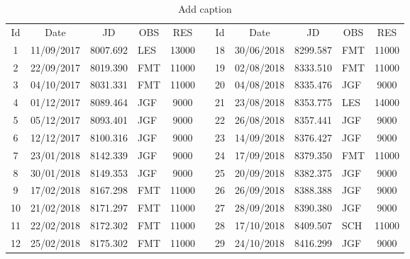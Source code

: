 \begin{table}[htbp]
  \centering
  \caption{Add caption}
    \begin{tabular}{|c|c|c|p{1.715em}|c|r|c|c|c|p{1.715em}|c|}
\cline{1-5}\cline{7-11}    Id    & Date  & JD    & \multicolumn{1}{c|}{OBS} & RES   &       & Id    & Date  & JD    & \multicolumn{1}{c|}{OBS} & RES \bigstrut\\
\cline{1-5}\cline{7-11}    1     & 11/09/2017 & 8007.692 & LES   & 13000 &       & 18    & 30/06/2018 & 8299.587 & FMT   & 11000 \bigstrut\\
\cline{1-5}\cline{7-11}    2     & 22/09/2017 & 8019.390 & FMT   & 11000 &       & 19    & 02/08/2018 & 8333.510 & FMT   & 11000 \bigstrut\\
\cline{1-5}\cline{7-11}    3     & 04/10/2017 & 8031.331 & FMT   & 11000 &       & 20    & 04/08/2018 & 8335.476 & JGF   & 9000 \bigstrut\\
\cline{1-5}\cline{7-11}    4     & 01/12/2017 & 8089.464 & JGF   & 9000  &       & 21    & 23/08/2018 & 8353.775 & LES   & 14000 \bigstrut\\
\cline{1-5}\cline{7-11}    5     & 05/12/2017 & 8093.401 & JGF   & 9000  &       & 22    & 26/08/2018 & 8357.441 & JGF   & 9000 \bigstrut\\
\cline{1-5}\cline{7-11}    6     & 12/12/2017 & 8100.316 & JGF   & 9000  &       & 23    & 14/09/2018 & 8376.427 & JGF   & 9000 \bigstrut\\
\cline{1-5}\cline{7-11}    7     & 23/01/2018 & 8142.339 & JGF   & 9000  &       & 24    & 17/09/2018 & 8379.350 & FMT   & 11000 \bigstrut\\
\cline{1-5}\cline{7-11}    8     & 30/01/2018 & 8149.353 & JGF   & 9000  &       & 25    & 20/09/2018 & 8382.375 & JGF   & 9000 \bigstrut\\
\cline{1-5}\cline{7-11}    9     & 17/02/2018 & 8167.298 & FMT   & 11000 &       & 26    & 26/09/2018 & 8388.388 & JGF   & 9000 \bigstrut\\
\cline{1-5}\cline{7-11}    10    & 21/02/2018 & 8171.297 & FMT   & 11000 &       & 27    & 28/09/2018 & 8390.380 & JGF   & 9000 \bigstrut\\
\cline{1-5}\cline{7-11}    11    & 22/02/2018 & 8172.302 & FMT   & 11000 &       & 28    & 17/10/2018 & 8409.507 & SCH   & 11000 \bigstrut\\
\cline{1-5}\cline{7-11}    12    & 25/02/2018 & 8175.302 & FMT   & 11000 &       & 29    & 24/10/2018 & 8416.299 & JGF   & 9000 \bigstrut\\

\end{tabular}
\end{table}
